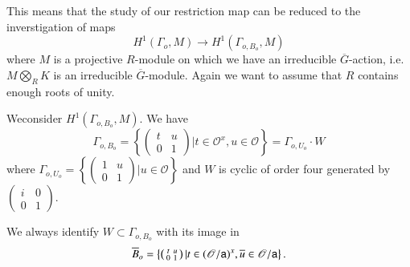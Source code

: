 This means that the study of our restriction map can be reduced to the inverstigation of maps
$$
H^{1}(\Gamma_{o},M)\to H^{1}(\Gamma_{o,B_{o}},M)
$$
where $M$ is a projective $R$-module on which we have an irreducible $\overline{G}$-action, i.e. $M\bigotimes\limits_{R}K$ is an irreducible $\overline{G}$-module. Again we want to assume that $R$ contains enough roots of unity.

We\pageoriginale consider $H^{1}(\Gamma_{o,B_{o}},M)$. We have
$$
\Gamma_{o,B_{o}}=\left\{\left(\begin{matrix} t & u\\ 0 & 1\end{matrix}\right)|t\in \mathscr{O}^{x},u\in \mathscr{O}\right\}=\Gamma_{o,U_{o}}\cdot W
$$
where $\Gamma_{o,U_{o}}=\left\{\left(\begin{smallmatrix} 1 & u\\ 0 & 1\end{smallmatrix}\right)|u\in \mathscr{O}\right\}$ and $W$ is cyclic of order four generated by $\left(\begin{smallmatrix} i & 0\\ 0 & 1\end{smallmatrix}\right)$.

We always identify $W\subset \Gamma_{o,B_{o}}$ with its image in 
$$
\overline{B}_{o}=\left\{\left(\begin{smallmatrix} t & u\\ 0 & 1\end{smallmatrix}\right) | t\in (\mathscr{O}/\mathsf{a})^{x}, \overline{u}\in \mathscr{O}/\mathsf{a}\right\}.
$$


